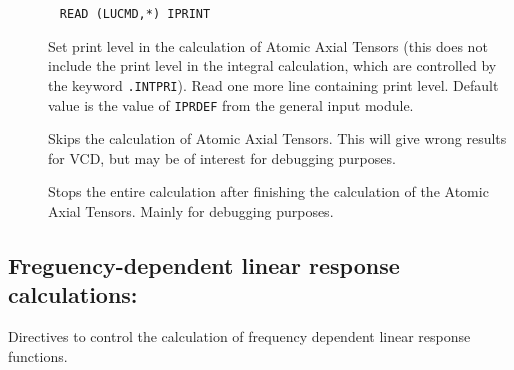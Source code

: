 \begin{description}
\item[]\verb| |\newline
\verb|READ (LUCMD,*) IPRINT|

Set print level in the calculation of Atomic Axial Tensors (this does
not include the print level in the integral calculation, which are
controlled by the keyword \verb|.INTPRI|). Read one
more line containing print level. Default value is the value of
\verb|IPRDEF| from the general input module.

\item[] Skips the calculation of Atomic Axial Tensors.
This will give wrong results for VCD, but may be of interest for
debugging purposes.

\item[] Stops the entire calculation after finishing the
calculation of the Atomic Axial Tensors. Mainly for debugging purposes.
\end{description}

\subsection{Freguency-dependent linear response calculations: }\label{sec:abalnr}

Directives to control the calculation of frequency dependent linear
response
functions.

